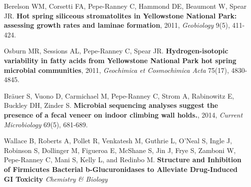 \documentclass[letterpaper]{article}
\renewenvironment{itemize}{
  \begin{list}{}{
    \setlength{\leftmargin}{1.5em}
  }
}{
  \end{list}
}
\begin{document}
\begin{itemize}
\item Berelson WM, Corsetti FA, Pepe-Ranney C, Hammond DE, Beaumont W, Spear
    JR. \textbf{Hot spring siliceous stromatolites in Yellowstone National Park:
    assessing growth rates and laminae formation}, 2011, {\it Geobiology}
    9(5), 411-424.

\item Osburn MR, Sessions AL, Pepe-Ranney C, Spear JR. \textbf{Hydrogen-isotopic
    variability in fatty acids from Yellowstone National Park hot spring
    microbial communities}, 2011, {\it Geochimica et Cosmochimica Acta}
    75(17), 4830-4845.

\item Br\"{a}uer S, Vuono D, Carmichael M, Pepe-Ranney C, Strom A, Rabinowitz
    E, Buckley DH, Zinder S. \textbf{Microbial sequencing analyses suggest
    the presence of a fecal veneer on indoor climbing wall holds.}, 2014, 
    {\it Current Microbiology} 69(5), 681-689.

\item Wallace B, Roberts A, Pollet R, Venkatesh M, 
    Guthrie L, O'Neal S, Ingle J, Robinson S, Dollinger M, Figueroa E, 
    McShane S, Jin J, Frye S, Zamboni W, Pepe-Ranney C, Mani S, Kelly
    L, and Redinbo M. \textbf{Structure and Inhibition of Firmicutes
    Bacterial b-Glucuronidases to Alleviate Drug-Induced GI Toxicity}
    \textit{Chemistry \& Biology}\\

\end{itemize}
\end{document}
